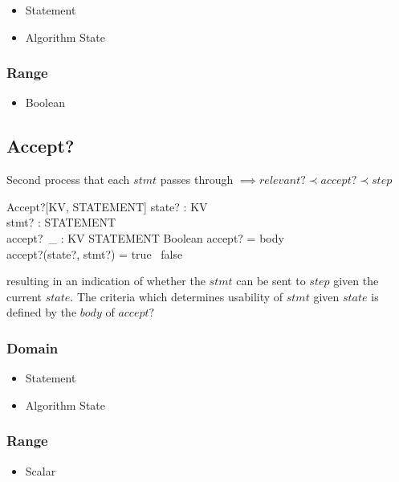 \documentclass[../main.tex]{subfiles}
\begin{document}
\begin{itemize}
\item Statement
\item Algorithm State
\end{itemize}

\subsubsection{Range}

\begin{itemize}
\item Boolean
\end{itemize}

\subsection{Accept?}

Second process that each $stmt$ passes through $\implies relevant? \prec accept? \prec step$
\begin{schema}{Accept?[KV, STATEMENT]}
  state? : KV \\
  stmt? : STATEMENT \\
  accept?~\_ : KV \cross STATEMENT \fun Boolean
  \where
  accept? = \langle body \rangle \\
  accept?(state?, stmt?) = true ~\lor false
\end{schema}
resulting in an indication of whether the $stmt$ can be sent to $step$ given the current $state$.
The criteria which determines usability of $stmt$ given $state$ is defined by the $body$ of $accept?$


\subsubsection{Domain}

\begin{itemize}
\item Statement
\item Algorithm State
\end{itemize}

\subsubsection{Range}

\begin{itemize}
\item Scalar
\end{itemize}
\end{document}
